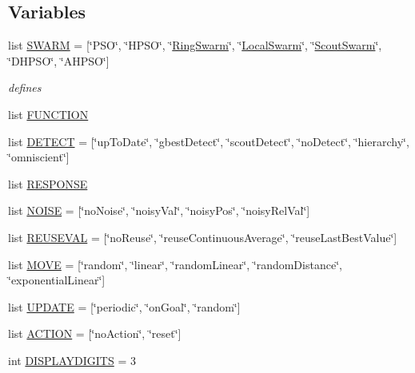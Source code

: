 \subsection*{Variables}
\begin{CompactItemize}
\item 
list \hyperlink{namespacepsoParameter_8c506a739f861e738168c13965bb7b97}{SWARM} = \mbox{[}\char`\"{}PSO\char`\"{}, \char`\"{}HPSO\char`\"{}, \char`\"{}\hyperlink{classRingSwarm}{RingSwarm}\char`\"{}, \char`\"{}\hyperlink{classLocalSwarm}{LocalSwarm}\char`\"{}, \char`\"{}\hyperlink{classScoutSwarm}{ScoutSwarm}\char`\"{}, \char`\"{}DHPSO\char`\"{}, \char`\"{}AHPSO\char`\"{}\mbox{]}
\begin{CompactList}\small\item\em defines \item\end{CompactList}\item 
list \hyperlink{namespacepsoParameter_8a376bdd4cff69bfa904eeb5f84f0885}{FUNCTION}
\item 
list \hyperlink{namespacepsoParameter_c3a16f0779048e976fb7b3cd433341cc}{DETECT} = \mbox{[}\char`\"{}upToDate\char`\"{}, \char`\"{}gbestDetect\char`\"{}, \char`\"{}scoutDetect\char`\"{}, \char`\"{}noDetect\char`\"{}, \char`\"{}hierarchy\char`\"{}, \char`\"{}omniscient\char`\"{}\mbox{]}
\item 
list \hyperlink{namespacepsoParameter_255de28f519b789225020cbc7c76de44}{RESPONSE}
\item 
list \hyperlink{namespacepsoParameter_5db0853bad8fafe75ecaf2bfc3d7680a}{NOISE} = \mbox{[}\char`\"{}noNoise\char`\"{}, \char`\"{}noisyVal\char`\"{}, \char`\"{}noisyPos\char`\"{}, \char`\"{}noisyRelVal\char`\"{}\mbox{]}
\item 
list \hyperlink{namespacepsoParameter_33cd7a25f6b6fae6a5b4cbdf3486e87f}{REUSEVAL} = \mbox{[}\char`\"{}noReuse\char`\"{}, \char`\"{}reuseContinuousAverage\char`\"{}, \char`\"{}reuseLastBestValue\char`\"{}\mbox{]}
\item 
list \hyperlink{namespacepsoParameter_a4578325a0b872e372edd88359ecb231}{MOVE} = \mbox{[}\char`\"{}random\char`\"{}, \char`\"{}linear\char`\"{}, \char`\"{}randomLinear\char`\"{}, \char`\"{}randomDistance\char`\"{}, \char`\"{}exponentialLinear\char`\"{}\mbox{]}
\item 
list \hyperlink{namespacepsoParameter_650145c6da87a472c29cd6a5feabaff4}{UPDATE} = \mbox{[}\char`\"{}periodic\char`\"{}, \char`\"{}onGoal\char`\"{}, \char`\"{}random\char`\"{}\mbox{]}
\item 
list \hyperlink{namespacepsoParameter_5a19c0c85591e50181f25d79d0fd1484}{ACTION} = \mbox{[}\char`\"{}noAction\char`\"{}, \char`\"{}reset\char`\"{}\mbox{]}
\item 
int \hyperlink{namespacepsoParameter_1d199c6e031504b8d49ff109bd54cbeb}{DISPLAYDIGITS} = 3
\end{CompactItemize}


